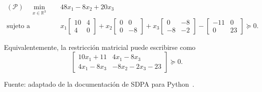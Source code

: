\begin{table}[H]
\centering
\caption{Problema SDP asociado al ejemplo en formato SDPA.}
\label{tab:sdpa_problem_example}
\begin{minipage}{0.9\textwidth}
\[
\begin{aligned}
(\mathcal{P})\quad
\min_{x\in\mathbb{R}^3}\quad
& 48x_1 - 8x_2 + 20x_3 \\
\text{sujeto a}\quad
& x_1
\begin{bmatrix}
10 & 4 \\
4 & 0
\end{bmatrix}
 + x_2
\begin{bmatrix}
0 & 0 \\
0 & -8
\end{bmatrix}
 + x_3
\begin{bmatrix}
0 & -8 \\
-8 & -2
\end{bmatrix}
 -
\begin{bmatrix}
-11 & 0 \\
0 & 23
\end{bmatrix}
\succeq 0.
\end{aligned}
\]

Equivalentemente, la restricción matricial puede escribirse como
\[
\begin{bmatrix}
10x_1 + 11 & 4x_1 - 8x_3 \\
4x_1 - 8x_3 & -8x_2 - 2x_3 - 23
\end{bmatrix}
\succeq 0.
\]
\end{minipage}

\vspace{0.15cm}
{\footnotesize Fuente: adaptado de la documentación de SDPA para Python~\parencite{SDPAFormat}.}
\end{table}
